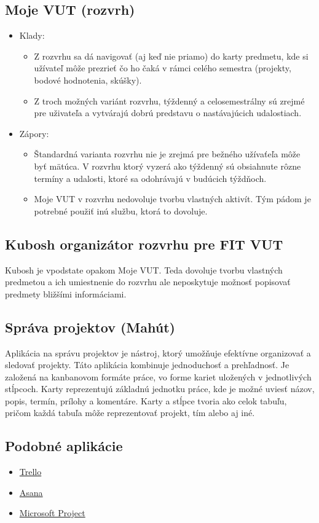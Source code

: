 \documentclass[a4paper, 11pt, onecolumn]{article}
\begin{document}
\subsection*{Moje VUT (rozvrh)}
\begin{itemize}
    \item Klady:
    \begin{itemize}
        \item Z rozvrhu sa dá navigovať (aj keď nie priamo) do karty predmetu, kde si užívateľ môže prezrieť čo ho čaká v rámci celého semestra (projekty, bodové hodnotenia, skúšky). 
        \item Z troch možných variánt rozvrhu, týždenný a celosemestrálny sú zrejmé pre uživateľa a vytvárajú dobrú predstavu o nastávajúcich udalostiach. 
    \end{itemize}
    \item Zápory:
    \begin{itemize}
        \item Štandardná varianta rozvrhu nie je zrejmá pre bežného užívaťeľa môže byť mätúca. V rozvrhu ktorý vyzerá ako týždenný sú obsiahnute rôzne termíny a udalosti, ktoré sa odohrávajú v budúcich týždňoch.
        \item Moje VUT v rozvrhu nedovoluje tvorbu vlastných aktivít. Tým pádom je potrebné použiť inú službu, ktorá to dovoluje.
    \end{itemize}
\end{itemize}
\subsection*{Kubosh organizátor rozvrhu pre FIT VUT}
Kubosh je vpodstate opakom Moje VUT. Teda dovoluje tvorbu vlastných predmetou a ich umiestnenie do rozvrhu
ale neposkytuje možnosť popisovať predmety bližšími informáciami.

\subsection{Správa projektov (Mahút)}
Aplikácia na správu projektov je nástroj, ktorý umožňuje efektívne organizovať a sledovať projekty.
Táto aplikácia kombinuje jednoduchosť a prehľadnosť. Je založená na kanbanovom formáte práce, vo forme kariet uložených v jednotlivých stĺpcoch.
Karty reprezentujú základnú jednotku práce, kde je možné uviesť názov, popis, termín, prílohy a komentáre.
Karty a stĺpce tvoria ako celok tabuľu, pričom každá tabuľa môže reprezentovať projekt, tím alebo aj iné.
\subsection*{Podobné aplikácie}
\begin{itemize}
    \item \href{https://trello.com/home}{Trello}
    \item \href{https://asana.com/}{Asana}
    \item \href{https://www.microsoft.com/cs-cz/microsoft-365/project/project-management-software}{Microsoft Project}
\end{itemize}
\end{document}
